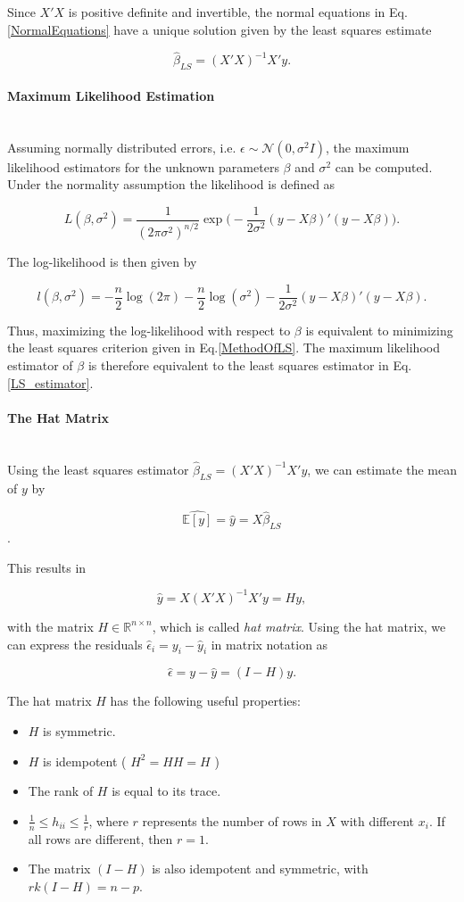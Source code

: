 \documentclass[10pt,a4paper]{article}
\newcommand{\subsubsubsection}[1]{\paragraph{#1}\mbox{}\\}
\begin{document}
Since $X'X$ is positive definite and invertible, the normal equations in Eq.\ref{NormalEquations} have a unique solution given by the least squares estimate

\begin{equation} \label{LS_estimator}
\hat \beta_{LS} = (X'X)^{-1}X'y.
\end{equation}

\subsubsubsection{Maximum Likelihood Estimation}

Assuming normally distributed errors, i.e. $\epsilon \sim \mathcal N(0, \sigma^2I)$, the maximum likelihood estimators for the unknown parameters $\beta$ and $\sigma^2$ can be computed. Under the normality assumption the likelihood is defined as

$$L(\beta, \sigma^2) = \frac{1}{(2\pi\sigma^2)^{n/2}} \exp \Big( -\frac{1}{2\sigma^2}(y - X\beta)'(y - X\beta) \Big).$$

The log-likelihood is then given by

$$l(\beta, \sigma^2) = -\frac{n}{2}\log(2\pi) - \frac{n}{2}\log(\sigma^2) - \frac{1}{2\sigma^2}(y - X\beta)'(y - X\beta).$$

Thus, maximizing the log-likelihood with respect to $\beta$ is equivalent to minimizing the least squares criterion given in Eq.\ref{MethodOfLS}. The maximum likelihood estimator of $\beta$ is therefore equivalent to the least squares estimator in Eq.\ref{LS_estimator}.

\subsubsubsection{The Hat Matrix}

Using the least squares estimator $\hat \beta_{LS} = (X'X)^{-1}X'y$, we can estimate the mean of $y$ by 

$$\widehat{\mathbb{E}[y]} = \hat y = X\hat\beta_{LS}$$. 

This results in 

\begin{equation} \label{HatMatrix}
	\hat y = X(X'X)^{-1}X'y = Hy,
\end{equation}

with the matrix $H \in \mathbb{R}^{n \times n}$, which is called \emph{hat matrix}. Using the hat matrix, we can express the residuals $\hat \epsilon_i = y_i - \hat y_i$ in matrix notation as

$$\hat \epsilon = y - \hat y = (I - H) y.$$

The hat matrix $H$ has the following useful properties:

\begin{itemize}
\item  $H$ is symmetric.
\item $H$ is idempotent ( $H^2 = HH = H$ )
\item The rank of $H$ is equal to its trace.
\item $\frac{1}{n} \le h_{ii} \le \frac{1}{r}$, where $r$ represents the number of rows in $X$ with different $x_i$. If all rows are different, then $r = 1$.
\item The matrix $(I - H)$ is also idempotent and symmetric, with $rk(I - H) = n-p$.
\end{itemize}
\end{document}
